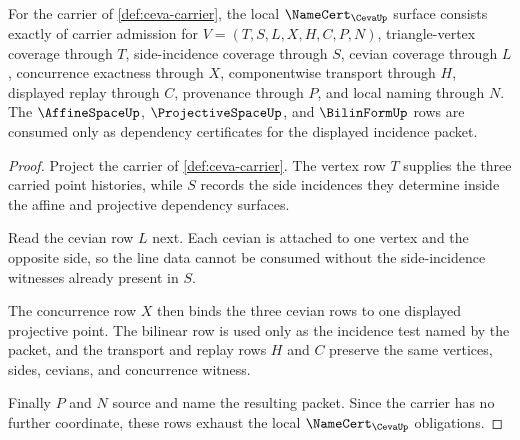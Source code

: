 \begin{theorem}
\label{thm:ceva-namecert-obligations}
For the carrier of \autoref{def:ceva-carrier}, the local $\NameCert_{\CevaUp}$ surface consists exactly of carrier admission for $V=(T,S,L,X,H,C,P,N)$, triangle-vertex coverage through $T$, side-incidence coverage through $S$, cevian coverage through $L$, concurrence exactness through $X$, componentwise transport through $H$, displayed replay through $C$, provenance through $P$, and local naming through $N$. The $\AffineSpaceUp$, $\ProjectiveSpaceUp$, and $\BilinFormUp$ rows are consumed only as dependency certificates for the displayed incidence packet.
\end{theorem}
\begin{proof}
Project the carrier of \autoref{def:ceva-carrier}. The vertex row $T$ supplies the three carried point histories, while $S$ records the side incidences they determine inside the affine and projective dependency surfaces.

Read the cevian row $L$ next. Each cevian is attached to one vertex and the opposite side, so the line data cannot be consumed without the side-incidence witnesses already present in $S$.

The concurrence row $X$ then binds the three cevian rows to one displayed projective point. The bilinear row is used only as the incidence test named by the packet, and the transport and replay rows $H$ and $C$ preserve the same vertices, sides, cevians, and concurrence witness.

Finally $P$ and $N$ source and name the resulting packet. Since the carrier has no further coordinate, these rows exhaust the local $\NameCert_{\CevaUp}$ obligations.
\end{proof}

